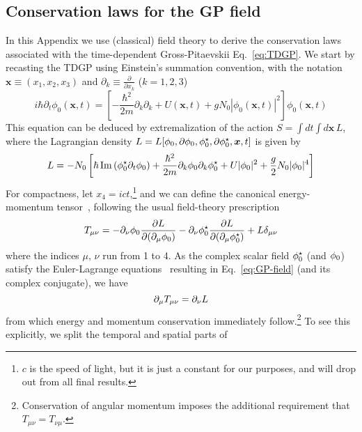 \begin{subappendices}
\section{Conservation laws for the GP field}
\label{app:field-theory}
%
In this Appendix we use (classical) field theory to derive the
conservation laws associated with the time-dependent Gross-Pitaevskii
Eq.~\eqref{eq:TDGP}. We start by recasting the TDGP using Einstein's
summation convention, with the notation $\bm{x} \equiv (x_1, x_2,
x_3)$ and $\partial_k \equiv \frac{\partial}{\partial x_k}$ ($k =
1,2,3$)
%
\begin{equation}\label{eq:GP-field}
    i\hbar\partial_t\phi_0(\bm{x},t) = 
  \left[-\frac{\hbar^2}{2m}\partial_k\partial_k + U(\bm{x},t) + g N_0 |\phi_0(\bm{x},t)|^2\right]\phi_0(\bm{x},t)
\end{equation}
% 
This equation can be deduced by extremalization of the action
$S = \int dt \int d\bm{x} \,L$, where the Lagrangian density
$L = L[\phi_{0}, \partial \phi_{0}, \phi_{0}^{\star}, \partial \phi_{0}^{\star}, \bm{x}, t]$ is given by
%
\begin{equation}\label{eq:GP-action}
  L = -N_0\left[\hbar \operatorname{Im}\left(\phi_{0}^{\star} \partial_t \phi_{0}\right) + 
\frac{\hbar^2}{2m}\partial_k\phi_{0}\partial_k\phi_{0}^{\star} + U\vert \phi_{0} \vert^2 + \frac{g}{2}N_0\vert \phi_{0} \vert^4 \right]
\end{equation}
% 
For compactness, let $x_4 = i c t$,\footnote{$c$ is the speed of
  light, but it is just a constant for our purposes, and will drop out
  from all final results.}  and we can define the canonical
energy-momentum tensor~\cite{Landau:101807}, following the usual
field-theory prescription~\cite{wentzel2003quantum}
%
\begin{equation}\label{eq:en-mom-tensor}
  T_{\mu \nu} = - \partial_{\nu} \phi_{0} \frac{\partial L}{\partial (\partial_{\mu} \phi_{0})} - \partial_{\nu} \phi_{0}^{\star} \frac{\partial L}{\partial (\partial_{\mu} \phi_{0}^{\star})} + L \delta_{\mu \nu}
\end{equation}
% 
where the indices $\mu,\,\nu$ run from 1 to 4. As the complex scalar
field $\phi_{0}^{\star}$ (and $\phi_{0}$) satisfy the Euler-Lagrange
equations~\cite{Landau:101804} resulting in Eq.~\eqref{eq:GP-field}
(and its complex conjugate), we have
%
\begin{equation}\label{eq:conservation-laws}
  \partial_{\mu} T_{\mu\nu} = \partial_{\nu} L
\end{equation}
% 
from which energy and momentum conservation immediately
follow.\footnote{Conservation of angular momentum imposes the
  additional requirement that $T_{\mu\nu} = T_{\nu\mu}$.}
%
To see this explicitly, we split the temporal and spatial parts of

\end{subappendices}
